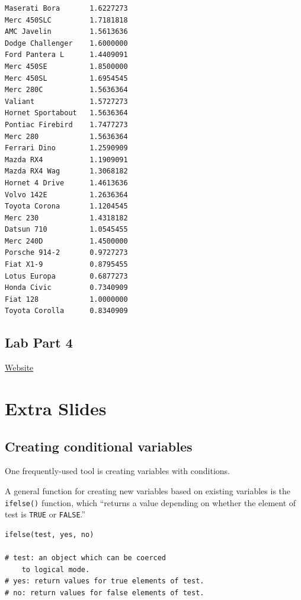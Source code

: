 \documentclass[
]{article}
\begin{document}
\begin{verbatim}
Maserati Bora       1.6227273
Merc 450SLC         1.7181818
AMC Javelin         1.5613636
Dodge Challenger    1.6000000
Ford Pantera L      1.4409091
Merc 450SE          1.8500000
Merc 450SL          1.6954545
Merc 280C           1.5636364
Valiant             1.5727273
Hornet Sportabout   1.5636364
Pontiac Firebird    1.7477273
Merc 280            1.5636364
Ferrari Dino        1.2590909
Mazda RX4           1.1909091
Mazda RX4 Wag       1.3068182
Hornet 4 Drive      1.4613636
Volvo 142E          1.2636364
Toyota Corona       1.1204545
Merc 230            1.4318182
Datsun 710          1.0545455
Merc 240D           1.4500000
Porsche 914-2       0.9727273
Fiat X1-9           0.8795455
Lotus Europa        0.6877273
Honda Civic         0.7340909
Fiat 128            1.0000000
Toyota Corolla      0.8340909
\end{verbatim}

\hypertarget{lab-part-4}{%
\subsection{Lab Part 4}\label{lab-part-4}}

\href{http://https://jhudatascience.org/intro_to_R_class/index.html}{Website}

\hypertarget{extra-slides}{%
\section{Extra Slides}\label{extra-slides}}

\hypertarget{creating-conditional-variables}{%
\subsection{Creating conditional
variables}\label{creating-conditional-variables}}

One frequently-used tool is creating variables with conditions.

A general function for creating new variables based on existing
variables is the \texttt{ifelse()} function, which ``returns a value
depending on whether the element of test is \texttt{TRUE} or
\texttt{FALSE}.''

\begin{verbatim}
ifelse(test, yes, no)

# test: an object which can be coerced
    to logical mode.
# yes: return values for true elements of test.
# no: return values for false elements of test.
\end{verbatim}
\end{document}
